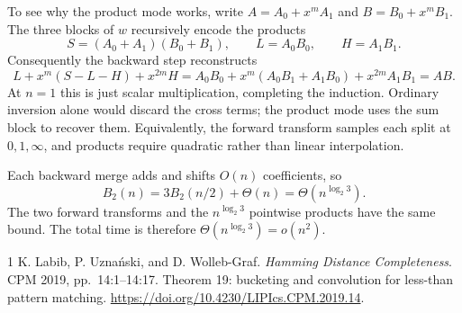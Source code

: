 \documentclass[11pt]{article}
\begin{document}
To see why the product mode works, write
$A=A_0+x^mA_1$ and $B=B_0+x^mB_1$. The three blocks of $w$ recursively
encode the products
\[
 S=(A_0+A_1)(B_0+B_1),\qquad L=A_0B_0,\qquad H=A_1B_1.
\]
Consequently the backward step reconstructs
\[
 L+x^m(S-L-H)+x^{2m}H
 =A_0B_0+x^m(A_0B_1+A_1B_0)+x^{2m}A_1B_1=AB.
\]
At $n=1$ this is just scalar multiplication, completing the induction.
Ordinary inversion alone would discard the cross terms; the product mode
uses the sum block to recover them. Equivalently, the forward transform
samples each split at $0,1,\infty$, and products require quadratic rather
than linear interpolation.

Each backward merge adds and shifts $O(n)$ coefficients, so
\[
 B_2(n)=3B_2(n/2)+\Theta(n)=\Theta(n^{\log_2 3}).
\]
The two forward transforms and the $n^{\log_2 3}$ pointwise products have
the same bound. The total time is therefore
$\boxed{\Theta(n^{\log_2 3})=o(n^2)}$.

\begin{thebibliography}{1}
K. Labib, P. Uzna\'{n}ski, and D. Wolleb-Graf.
\emph{Hamming Distance Completeness}. CPM 2019, pp.\ 14:1--14:17.
Theorem 19: bucketing and convolution for less-than pattern matching.
\url{https://doi.org/10.4230/LIPIcs.CPM.2019.14}.
\end{thebibliography}
\end{document}
